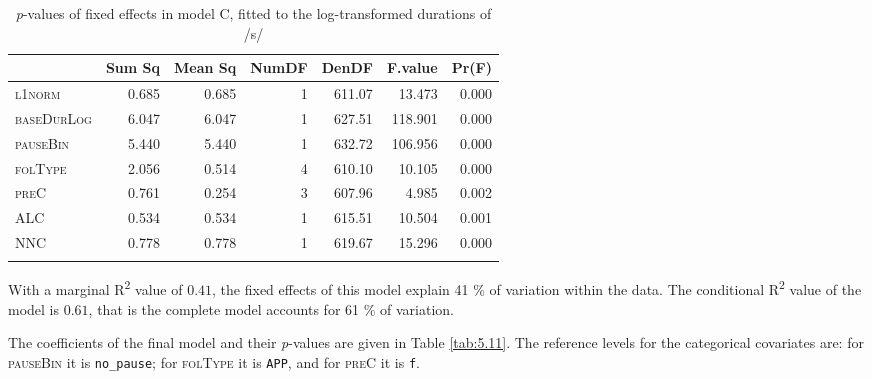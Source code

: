 \begin{table}\fontsize{10}{11}
\caption{\textit{p}-values of fixed effects in model C, fitted to the log-transformed durations of /s/}
\label{tab:5.10}
\centering
\begin{tabular}{lrrrrrr} 
\lsptoprule
~          & Sum Sq & Mean Sq & NumDF & DenDF  & F.value & Pr(F)  \\ 
\midrule
\textsc{l1norm}     & 0.685  & 0.685   & 1     & 611.07 & 13.473  & 0.000  \\
\textsc{baseDurLog} & 6.047  & 6.047   & 1     & 627.51 & 118.901 & 0.000  \\
\textsc{pauseBin}   & 5.440  & 5.440   & 1     & 632.72 & 106.956 & 0.000  \\
\textsc{folType}    & 2.056  & 0.514   & 4     & 610.10 & 10.105  & 0.000  \\
\textsc{preC}       & 0.761  & 0.254   & 3     & 607.96 & 4.985   & 0.002  \\
\textsc{ALC}        & 0.534  & 0.534   & 1     & 615.51 & 10.504  & 0.001  \\
\textsc{NNC}        & 0.778  & 0.778   & 1     & 619.67 & 15.296  & 0.000  \\
\lspbottomrule
\end{tabular}
\end{table}

With a marginal R\textsuperscript{2} value of $0.41$, the fixed effects of this model explain 41 \% of variation within the data. The conditional R\textsuperscript{2} value of the model is $0.61$, that is the complete model accounts for 61 \% of variation.

The coefficients of the final model and their \textit{p}-values are given in Table \ref{tab:5.11}. The reference levels for the categorical covariates are: for \textsc{pauseBin} it is \texttt{no\_pause}; for \textsc{folType} it is \texttt{APP}, and for \textsc{preC} it is \texttt{f}.

